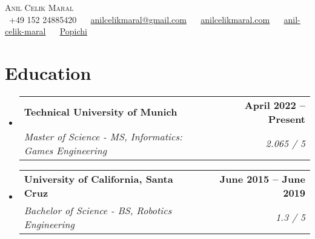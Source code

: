 \documentclass[letterpaper,11pt]{article}
\makeatletter
\newcommand{\resumeSubheading}[4]{
  \vspace{-2pt}\item
    \begin{tabular*}{1.0\textwidth}[t]{l@{\extracolsep{\fill}}r}
      \textbf{#1} & \textbf{\small #2} \\
      \textit{\small#3} & \textit{\small #4} \\
    \end{tabular*}\vspace{-7pt}
}
\newcommand{\resumeSubHeadingListStart}{\begin{itemize}[leftmargin=0.0in, label={}]}
\newcommand{\resumeSubHeadingListEnd}{\end{itemize}}
\makeatother
\begin{document}

\begin{center}
    {\Huge \scshape Anil Celik Maral} \\ \vspace{1pt}
    \vspace{1pt}
    \small \raisebox{-0.1\height}\faPhone\ +49 152 24885420 ~ {\raisebox{-0.2\height}\faEnvelope\  \underline{anilcelikmaral@gmail.com}} ~ 
    {\raisebox{-0.2\height}\faGlobe\ \underline{anilcelikmaral.com}}  ~
    {\raisebox{-0.2\height}\faLinkedin\ \underline{anil-celik-maral}}  ~
    {\raisebox{-0.2\height}\faGithub\ \underline{Popichi}}
    \vspace{-10pt}  
    
\end{center}


\section{Education}
  \resumeSubHeadingListStart
    \resumeSubheading
      {Technical University of Munich}{April 2022 -- Present}
      {Master of Science - MS, Informatics: Games Engineering}{2.065 / 5}
      \resumeSubheading
      {University of California, Santa Cruz}{June 2015 -- June 2019}
      {Bachelor of Science - BS, Robotics Engineering}{1.3 / 5}

  \resumeSubHeadingListEnd

       
\end{document}
